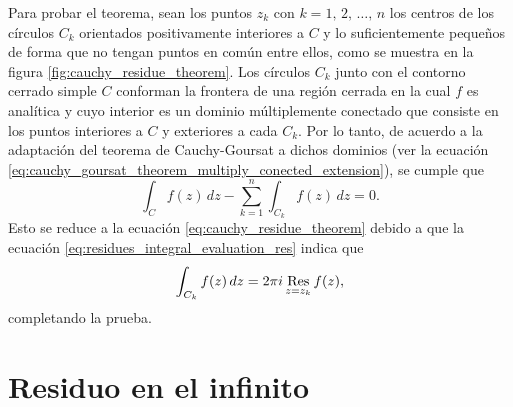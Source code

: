 \documentclass[a4paper]{report}
\def\Res{\qopname\relax m{Res}}
\begin{document}
Para probar el teorema, sean los puntos \(z_k\) con \(k=1,\,2,\,\dots,\,n\) los centros de los círculos \(C_k\) orientados positivamente interiores a \(C\) y lo suficientemente pequeños de forma que no tengan puntos en común entre ellos, como se muestra en la figura \ref{fig:cauchy_residue_theorem}. Los círculos \(C_k\) junto con el contorno cerrado simple \(C\) conforman la frontera de una región cerrada en la cual \(f\) es analítica y cuyo interior es un dominio múltiplemente conectado que consiste en los puntos interiores a \(C\) y exteriores a cada \(C_k\). Por lo tanto, de acuerdo a la adaptación del teorema de Cauchy-Goursat a dichos dominios (ver la ecuación \ref{eq:cauchy_goursat_theorem_multiply_conected_extension}), se cumple que 
\[
 \int_Cf(z)\,dz-\sum_{k=1}^n\int_{C_k}f(z)\,dz=0.
\]
Esto se reduce a la ecuación \ref{eq:cauchy_residue_theorem} debido a que la ecuación \ref{eq:residues_integral_evaluation_res} indica que 
\[
 \int_{C_k}f(z)\,dz=2\pi i\Res_{z=z_k}f(z),
\]
completando la prueba.

\section{Residuo en el infinito}\label{sec:residue_at_infinity}
\end{document}

